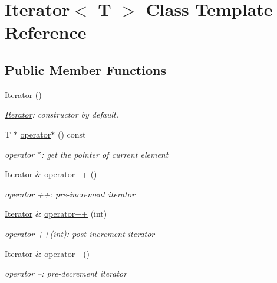 \hypertarget{class_iterator}{}\section{Iterator$<$ T $>$ Class Template Reference}
\label{class_iterator}
\subsection*{Public Member Functions}
\begin{DoxyCompactItemize}
\item 
\mbox{\label{class_iterator_a87d4af70ba6312e91e1ab6a7c9e2ec6d}} 
\hyperlink{class_iterator_a87d4af70ba6312e91e1ab6a7c9e2ec6d}{Iterator} ()
\begin{DoxyCompactList}\small\item\em \hyperlink{class_iterator}{Iterator}\+: constructor by default. \end{DoxyCompactList}\item 
T $\ast$ \hyperlink{class_iterator_a10ab6542ca4a31393939291780fa7fa2}{operator$\ast$} () const
\begin{DoxyCompactList}\small\item\em operator $\ast$\+: get the pointer of current element \end{DoxyCompactList}\item 
\hyperlink{class_iterator}{Iterator} \& \hyperlink{class_iterator_a7f820677fc6ee38192e0457090646cd6}{operator++} ()
\begin{DoxyCompactList}\small\item\em operator ++\+: pre-\/increment iterator \end{DoxyCompactList}\item 
\hyperlink{class_iterator}{Iterator} \& \hyperlink{class_iterator_a292066a3edaea39abf09e6a14328c489}{operator++} (int)
\begin{DoxyCompactList}\small\item\em \hyperlink{class_iterator_a292066a3edaea39abf09e6a14328c489}{operator ++(int)}\+: post-\/increment iterator \end{DoxyCompactList}\item 
\hyperlink{class_iterator}{Iterator} \& \hyperlink{class_iterator_a580d645f1163cd20b92b469477324509}{operator-\/-\/} ()
\begin{DoxyCompactList}\small\item\em operator --\+: pre-\/decrement iterator \end{DoxyCompactList}\item 

\end{DoxyCompactItemize}
